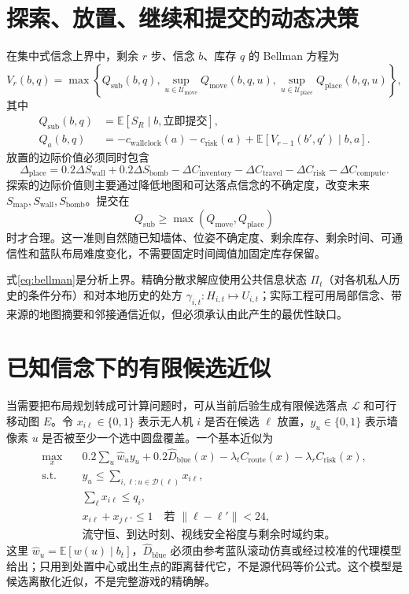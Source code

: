 \documentclass[UTF8,11pt]{ctexart}
\newcommand{\E}{\mathbb{E}}
\begin{document}
\section{探索、放置、继续和提交的动态决策}

在集中式信念上界中，剩余 $r$ 步、信念 $b$、库存 $q$ 的 Bellman 方程为
\begin{equation}
V_r(b,q)=\max\left\{
Q_{\mathrm{sub}}(b,q),
\sup_{u\in\mathcal U_{\mathrm{move}}}Q_{\mathrm{move}}(b,q,u),
\sup_{u\in\mathcal U_{\mathrm{place}}}Q_{\mathrm{place}}(b,q,u)
\right\},
\label{eq:bellman}
\end{equation}
其中
\begin{align}
Q_{\mathrm{sub}}(b,q)&=\E[S_R\mid b,\text{立即提交}],\\
Q_a(b,q)&=-c_{\mathrm{wallclock}}(a)-c_{\mathrm{risk}}(a)
+\E[V_{r-1}(b',q')\mid b,a].
\end{align}
放置的边际价值必须同时包含
\begin{equation}
\Delta_{\mathrm{place}}
=0.2\Delta S_{\mathrm{wall}}+0.2\Delta S_{\mathrm{bomb}}
-\Delta C_{\mathrm{inventory}}-\Delta C_{\mathrm{travel}}-\Delta C_{\mathrm{risk}}-\Delta C_{\mathrm{compute}}.
\end{equation}
探索的边际价值则主要通过降低地图和可达落点信念的不确定度，改变未来 $S_{\mathrm{map}},S_{\mathrm{wall}},S_{\mathrm{bomb}}$。提交在
\begin{equation}
Q_{\mathrm{sub}}\ge\max(Q_{\mathrm{move}},Q_{\mathrm{place}})
\end{equation}
时才合理。这一准则自然随已知墙体、位姿不确定度、剩余库存、剩余时间、可通信性和蓝队布局难度变化，不需要固定时间阈值加固定库存保留。

式\eqref{eq:bellman}是分析上界。精确分散求解应使用公共信息状态 $\Pi_t$（对各机私人历史的条件分布）和对本地历史的处方 $\gamma_{i,t}:H_{i,t}\mapsto U_{i,t}$；实际工程可用局部信念、带来源的地图摘要和邻接通信近似，但必须承认由此产生的最优性缺口。

\section{已知信念下的有限候选近似}

当需要把布局规划转成可计算问题时，可从当前后验生成有限候选落点 $\mathcal L$ 和可行移动图 $E$。令 $x_{i\ell}\in\{0,1\}$ 表示无人机 $i$ 是否在候选 $\ell$ 放置，$y_u\in\{0,1\}$ 表示墙像素 $u$ 是否被至少一个选中圆盘覆盖。一个基本近似为
\begin{align}
\max_x\quad &0.2\sum_u \widehat w_u y_u
+0.2\widehat D_{\mathrm{blue}}(x)
-\lambda_t C_{\mathrm{route}}(x)-\lambda_r C_{\mathrm{risk}}(x),\\
\text{s.t.}\quad
&y_u\le\sum_{i,\ell:u\in\mathcal D(\ell)}x_{i\ell},\\
&\sum_\ell x_{i\ell}\le q_i,\\
&x_{i\ell}+x_{j\ell'}\le1\quad\text{若 }\|\ell-\ell'\|<24,\\
&\text{流守恒、到达时刻、视线安全裕度与剩余时域约束。}
\end{align}
这里 $\widehat w_u=\E[w(u)\mid b_t]$，$\widehat D_{\mathrm{blue}}$ 必须由参考蓝队滚动仿真或经过校准的代理模型给出；只用到处置中心或出生点的距离替代它，不是源代码等价公式。这个模型是候选离散化近似，不是完整游戏的精确解。
\end{document}
